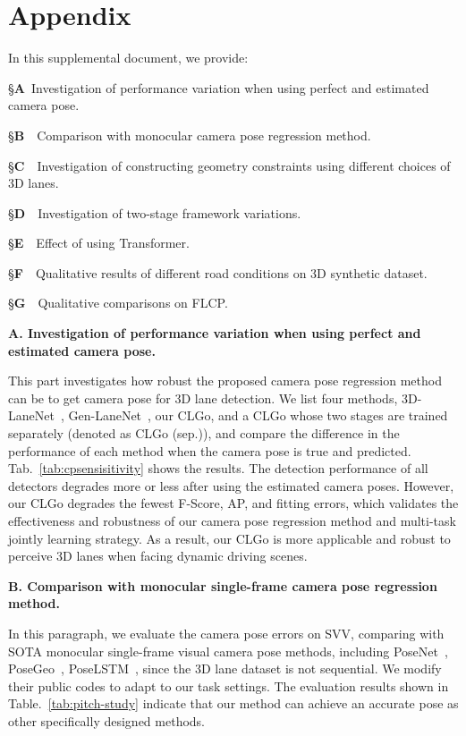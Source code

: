 \documentclass[letterpaper]{article} \usepackage{aaai22}  \usepackage{times}  \usepackage{helvet}  \usepackage{courier}  \usepackage[hyphens]{url}  \usepackage{graphicx} \urlstyle{rm} \def\UrlFont{\rm}  \usepackage{natbib}  \usepackage{caption}
\begin{document}


\section{Appendix}
In this supplemental document, we provide:


\S \textbf{A}~Investigation of performance variation when using perfect and estimated camera pose.

\S \textbf{B}~~Comparison with monocular camera pose regression method.

\S \textbf{C}~~Investigation of constructing geometry constraints using different choices of 3D lanes.

\S \textbf{D}~~Investigation of two-stage framework variations.

\S \textbf{E}~~Effect of using Transformer.

\S \textbf{F}~~Qualitative results of different road conditions on 3D synthetic dataset.

\S \textbf{G}~~Qualitative comparisons on FLCP.


\noindent \textbf{A. Investigation of performance variation when using perfect and estimated camera pose.}

This part investigates how robust the proposed camera pose regression method can be to get camera pose for 3D lane detection.
We list four methods, 3D-LaneNet~\cite{3DLaneNet}, Gen-LaneNet~\cite{GenLaneNet}, our CLGo, and a CLGo whose two stages are trained separately (denoted as CLGo (sep.)), and compare the difference in the performance of each method when the camera pose is true and predicted.
Tab.~\ref{tab:cpsensisitivity} shows the results.
The detection performance of all detectors degrades more or less after using the estimated camera poses. However, our CLGo degrades the fewest F-Score, AP, and fitting errors, which validates the effectiveness and robustness of our camera pose regression method and multi-task jointly learning strategy. As a result, our CLGo is more applicable and robust to perceive 3D lanes when facing dynamic driving scenes.

\noindent \textbf{B. Comparison with monocular single-frame camera pose regression method.}

In this paragraph, we evaluate the camera pose errors on SVV, comparing with SOTA monocular single-frame visual camera pose methods, including PoseNet~\cite{Kendall2015ICCV}, PoseGeo~\cite{Kendall2017CVPR}, PoseLSTM~\cite{Walch2017ICCV}, since the 3D lane dataset is not sequential. We modify their public codes to adapt to our task settings.
The evaluation results shown in Table.~\ref{tab:pitch-study} indicate that our method can achieve an accurate pose as other specifically designed methods. 
\end{document}
